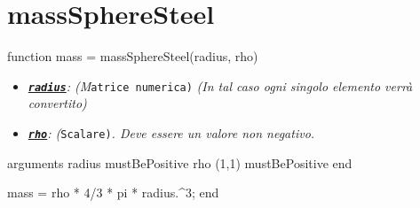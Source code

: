 
\section{massSphereSteel}\label{fnc:massSphereSteel}


\begin{matlabcode}
function mass = massSphereSteel(radius, rho)
\end{matlabcode}

\vspace{1em}


\begin{itemize}
\setlength{\itemsep}{-1ex}
   \item{\begin{flushleft} \texttt{\underline{\textit{\textbf{radius}}}}\textit{: (M}\texttt{atrice numerica)}\textit{ (In tal caso ogni singolo elemento verrà convertito)} \end{flushleft}}
   \item{\begin{flushleft} \texttt{\underline{\textit{\textbf{rho}}}}\textit{: (}\texttt{Scalare)}\textit{. Deve essere un valore non negativo.} \end{flushleft}}
\end{itemize}

\begin{matlabcode}
    arguments
        radius {mustBePositive}
        rho (1,1) {mustBePositive}
    end
\end{matlabcode}

\vspace{1em}


\begin{matlabcode}
    mass = rho * 4/3 * pi * radius.^3;
end
\end{matlabcode}
